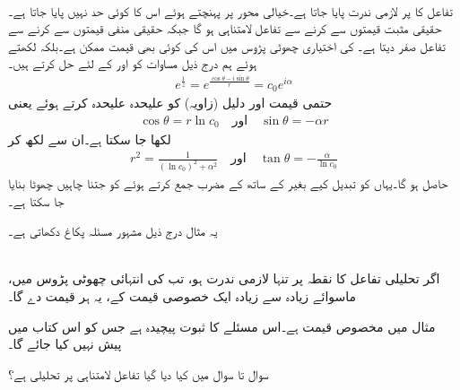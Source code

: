 \quad {}\\
تفاعل  کا  پر لازمی ندرت پایا جاتا ہے۔خیالی محور پر پہنچتے ہوئے اس کا کوئی حد نہیں پایا جاتا ہے۔حقیقی مثبت قیمتوں سے  کرنے سے تفاعل لامتناہی ہو گا جبکہ حقیقی منفی قیمتوں سے   کرنے سے تفاعل صفر دیتا ہے۔ کی اختیاری چھوٹی پڑوس میں اس کی کوئی بھی قیمت  ممکن ہے۔بلکہ  لکھتے ہوئے ہم درج ذیل مساوات کو  اور  کے لئے  حل کرتے ہیں۔
\begin{align*}
e^{\frac{1}{z}}=e^{\frac{\cos \theta-i\sin\theta}{r}}=c_0e^{i\alpha}
\end{align*}
حتمی قیمت اور دلیل (زاویہ) کو علیحدہ علیحدہ کرتے ہوئے     یعنی
\begin{align*}
\cos \theta=r\ln c_0 \quad \text{اور}\quad \sin \theta=-\alpha r 
\end{align*}
لکھا جا سکتا ہے۔ان سے  لکھ کر 
\begin{align*}
r^2=\frac{1}{(\ln c_0)^2+\alpha^2}\quad \text{اور}\quad \tan \theta=-\frac{\alpha}{\ln c_0}
\end{align*}
حاصل ہو گا۔یہاں   کو تبدیل کیے بغیر  کے ساتھ  کے مضرب جمع کرتے ہوئے  کو جتنا چاہیں چھوٹا بنایا جا سکتا ہے۔

یہ مثال درج ذیل مشہور مسئلہ پکاغ  دکھاتی ہے۔

\quad {}  \\
اگر تحلیلی تفاعل  کا نقطہ  پر تنہا لازمی ندرت ہو، تب  کی انتہائی چھوٹی پڑوس میں، ماسوائے زیادہ سے زیادہ ایک خصوصی قیمت کے، یہ ہر قیمت دے گا۔

مثال  میں مخصوص قیمت  ہے۔اس مسئلے کا ثبوت پیچیدہ ہے جس کو اس کتاب میں پیش نہیں کیا جائے گا۔ 

سوال  تا سوال  میں کیا دیا گیا تفاعل لامتناہی پر تحلیلی ہے؟


